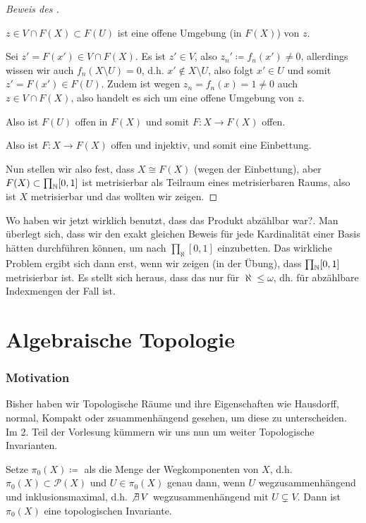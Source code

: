 \begin{proof}[Beweis des ]
\begin{subproof}
\begin{itemize}
\begin{claim}
                    $z\in V\cap F(X) \subset F(U)$ ist eine offene Umgebung (in $F(X)$) von  $z$.
                \end{claim}
                \begin{subproof}
                    Sei $z' = F(x')\in V\cap F(X)$. Es ist $z'\in V$, also $z_n' \coloneqq  f_n(x') \neq 0$, allerdings wissen wir auch $f_n(X\setminus U) = 0$, d.h. $x' \not\in X\setminus U$, also folgt $x'\in U$ und somit $z' = F(x') \in F(U)$. Zudem ist wegen $z_n = f_n(x)=1 \neq 0$ auch $z \in V \cap F(X)$, also handelt es sich um eine offene Umgebung von $z$.
                \end{subproof}
                Also ist $F(U)$ offen in  $F(X)$ und somit  $F\colon X \to  F(X)$ offen.
        \end{itemize}
        Also ist $F\colon X \to  F(X)$ offen und injektiv, und somit eine Einbettung.
    \end{subproof}
    Nun stellen wir also fest, dass $X \cong F(X)$ (wegen der Einbettung), aber  $F(X) \subset  \prod_{\mathbb{N}}[0,1]$ ist metrisierbar als Teilraum eines metrisierbaren Raums, also ist $X$ metrisierbar und das wollten wir zeigen.
\end{proof}

\begin{oral}
    Wo haben wir jetzt wirklich benutzt, dass das Produkt abzählbar war?. Man überlegt sich, dass wir den exakt gleichen Beweis für jede Kardinalität einer Basis hätten durchführen können, um nach $\prod_{\aleph} [0,1]$ einzubetten. Das wirkliche Problem ergibt sich dann erst, wenn wir zeigen (in der Übung), dass $\prod_{\mathbb{N}}[0,1]$ metrisierbar ist. Es stellt sich heraus, dass das nur für $\aleph\leq \omega $, dh. für abzählbare Indexmengen der Fall ist.
\end{oral}


\newpage
\part{Algebraische Topologie}

\section*{Motivation}

Bisher haben wir Topologische Räume und ihre Eigenschaften wie Hausdorff, normal, Kompakt oder zsuammenhängend gesehen, um diese zu unterscheiden. Im 2. Teil der Vorlesung kümmern wir uns nun um weiter Topologische Invarianten.
\begin{example}
    Setze $\pi_0(X) \coloneqq $ als die Menge der Wegkomponenten von  $X$, d.h.  $\pi_0(X) \subset \mathcal{P}(X)$ und $U\in \pi_0(X)$ genau dann, wenn $U$ wegzusammenhängend und inklusionsmaximal, d.h. $\not \exists \,V$ wegzusammenhängend mit $U\subsetneq  V$. Dann ist $\pi_0(X)$ eine topologischen Invariante.
\end{example}

